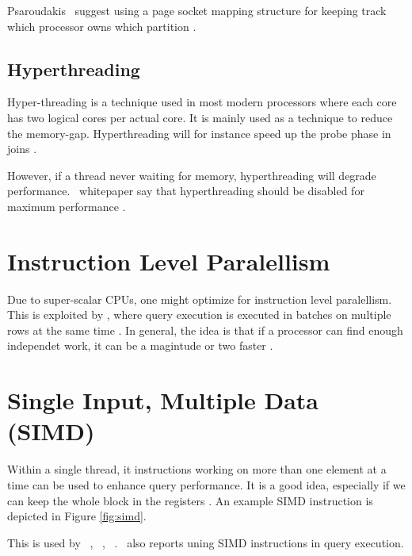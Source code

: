 Psaroudakis \ea~suggest using a page socket mapping structure for keeping track which processor owns which partition \cite{Psaroudakis2015-lc}.

\subsection{Hyperthreading}
\label{sub:Hyperthreading}
Hyper-threading is a technique used in most modern processors where each core has two logical cores per actual core. It is mainly used as a technique to reduce the memory-gap. Hyperthreading will for instance speed up the probe phase in joins \cite{Barber2014-ey}.

However, if a thread never waiting for memory, hyperthreading will degrade performance. \qlikview~whitepaper say that hyperthreading should be disabled for maximum performance \cite{QlikView2011-yc}. 

\section{Instruction Level Paralellism}
\label{sec:Instruction Level Paralellism}
Due to super-scalar CPUs, one might optimize for instruction level paralellism. This is exploited by \blink, where query execution is executed in batches on multiple rows at the same time \cite{Johnson2008-cp}. In general, the idea is that if a processor can find enough independet work, it can be a magintude or two faster \cite{Boncz2005-wj}.

\section{Single Input, Multiple Data (SIMD)}
\label{sec:Single Input, Multiple Instructions (SIMD)}
Within a single thread, it instructions working on more than one element at a time can be used to enhance query performance. It is a good idea, especially if we can keep the whole block in the registers \cite{Neumann2011-uq}. An example SIMD instruction is depicted in Figure \ref{fig:simd}.


This is used by \oracle~\cite{Lahiri2015-mz}, \blink~\cite{Barber2012-xt}, \ibm~\cite{Raman2013-em}. \exasol~also reports uning SIMD instructions in query execution.

